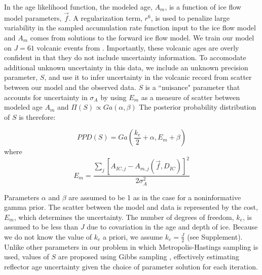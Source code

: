 In the age likelihood function, the modeled age, $A_m$, is a function of ice flow model parameters, $\vec{f}$. A regularization term, $r^6$, is used to penalize large variability in the sampled accumulation rate function input to the ice flow model and $A_m$ comes from solutions to the forward ice flow model. We train our model on $J=61$ volcanic events from \citet{hammer1997}. Importantly, these volcanic ages are overly confident in that they do not include uncertainty information. To accomodate additional unknown uncertainty in this data, we include an unknown precision parameter, $S$, and use it to infer uncertainty in the volcanic record from scatter between our model and the observed data. $S$ is a ``nuisance" parameter that accounts for uncertainty in $\sigma_A$ by using $E_m$ as a measure of scatter between modeled age $A_m$ and $\Pi(S) \propto Ga(\alpha,\beta)$ The posterior probability distribution of $S$ is therefore:

\begin{equation}\label{eqn:S}
PPD(S) = Ga(\frac{k_e}{2}+\alpha, E_m+\beta)
\end{equation}
where 
\begin{equation}
 E_m= \frac{\sum_{j}[A_{IC,j} - A_{m,j}(\vec{f},D_{IC})]^2}{2\sigma_A^2} 
\end{equation}

Parameters $\alpha$ and $\beta$ are assumed to be 1 as in the case for a noninformative gamma prior. The scatter between the model and data is represented by the cost, $E_m$, which determines the uncertainty. The number of degrees of freedom, $k_e$, is assumed to be less than $J$ due to covariation in the age and depth of ice. Because we do not know the value of $k_e$ a priori, we assume $k_e = \frac{J}{2}$ (see Supplement). Unlike other parameters in our problem in which Metropolis-Hastings sampling is used, values of $S$ are proposed using Gibbs sampling \citep{gelfand1992}, effectively estimating reflector age uncertainty given the choice of parameter solution for each iteration.



